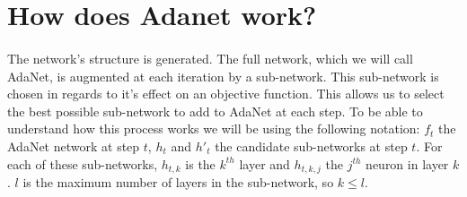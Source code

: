 \documentclass[11 pt]{article}
\begin{document}
\section{How does Adanet work?}
\paragraph{} The network's structure is generated. The full network, which we will call AdaNet, is augmented at each iteration by a sub-network. This sub-network is chosen in regards to it's effect on an objective function. This allows us to select the best possible sub-network to add to AdaNet at each step. To be able to understand how this process works we will be using the following notation: \(f_t\) the AdaNet network at step \(t\), \(h_t\) and \(h'_t\) the candidate sub-networks at step \(t\). For each of these sub-networks, \(h_{t,k}\) is the \(k^{th}\) layer and \(h_{t,k,j}\) the \(j^{th}\) neuron in layer \(k\). \(l\) is the maximum number of layers in the sub-network, so \(k\leq l\).

\end{document}
